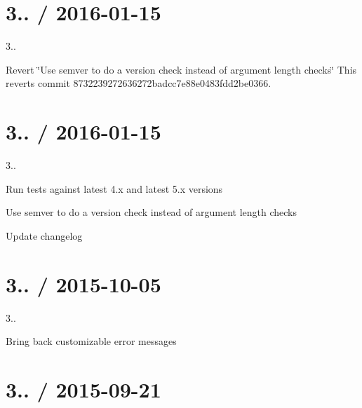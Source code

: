 \section*{3.. / 2016-\/01-\/15 }


\begin{DoxyItemize}
\item 3..
\item Revert \char`\"{}\+Use semver to do a version check instead of argument length checks\char`\"{} This reverts commit 8732239272636272badcc7e88e0483fdd2be0366.
\end{DoxyItemize}

\section*{3.. / 2016-\/01-\/15 }


\begin{DoxyItemize}
\item 3..
\item Run tests against latest 4.\+x and latest 5.\+x versions
\item Use semver to do a version check instead of argument length checks
\item Update changelog
\end{DoxyItemize}

\section*{3.. / 2015-\/10-\/05 }


\begin{DoxyItemize}
\item 3..
\item Bring back customizable error messages
\end{DoxyItemize}

\section*{3.. / 2015-\/09-\/21 }


